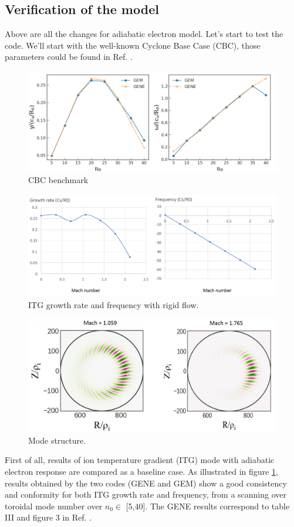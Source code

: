 \documentclass[12pt]{article}
\begin{document}
\begin{CJK*}{UTF8}{gbsn}
\newpage
\section{Verification of the model}
Above are all the changes for adiabatic electron model. Let's start to test the code. We'll start with the well-known
Cyclone Base Case (CBC), those parameters could be found in Ref. \cite{gorler}. 

\begin{figure}[htb!]
\centering
\includegraphics[width=1.\textwidth]{fig1.png}
\caption{CBC benchmark}
\label{fig1}
\end{figure}
\begin{figure}[htb!]
\centering
\includegraphics[width=1.\textwidth]{fig2.png}
\caption{ITG growth rate and frequency with rigid flow.}
\label{fig2}
\end{figure}
\begin{figure}[htb!]
\centering
\includegraphics[width=1.\textwidth]{fig3.png}
\caption{Mode structure.}
\label{fig3}
\end{figure}
First of all, results of ion temperature gradient (ITG) mode with adiabatic electron response are compared as a baseline
case. As illustrated in figure \ref{fig1}, results obtained by the two codes (GENE and GEM) show a good consistency and conformity 
for both ITG growth rate and frequency, from a scanning over toroidal mode number over $n_0\in$ [5,40]. The GENE results 
correspond to table III and figure 3 in Ref. \cite{gorler}. 


\end{CJK*}
\end{document}
